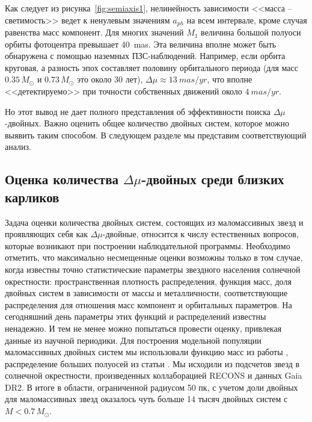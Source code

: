 Как следует из рисунка~\ref{fig:semiaxis1}, нелинейность зависимости <<масса -- светимость>> ведет к ненулевым значениям $a_{ph}$ на всем интервале, кроме случая равенства масс компонент. Для многих значений $M_1$ величина большой полуоси орбиты фотоцентра превышает 40~mas. Эта величина вполне может быть обнаружена с помощью наземных ПЗС-наблюдений. Например, если орбита круговая, а разность эпох составляет половину орбитального периода (для масс  $0.35\,M_\odot$ и $0.73\,M_\odot$ это около 30 лет), $\Delta\mu\approx 13~mas/yr$, что вполне <<детектируемо>> при точности собственных движений около $4~mas/yr$.  

Но этот вывод не дает полного представления об эффективности поиска  $\Delta\mu$-двойных. Важно оценить общее количество двойных систем, которое можно выявить таким способом. В следующем разделе мы представим соответствующий анализ.

\subsection{Оценка количества $\Delta\mu$-двойных среди близких карликов}\label{subsec:ch1/sect2/sub2}
Задача оценки количества двойных систем, состоящих из маломассивных звезд и проявляющих себя как $\Delta\mu$-двойные, относится к числу естественных вопросов, которые возникают при построении наблюдательной программы. Необходимо отметить, что максимально несмещенные оценки возможны только в том случае, когда известны  точно статистические параметры звездного населения солнечной окрестности: пространственная плотность распределения, функция  масс, доля двойных систем в зависимости от массы и металличности, соответствующие распределения для отношения масс компонент и орбитальных параметров. На сегодняшний день параметры этих функций и распределений известны ненадежно. И тем не менее можно попытаться провести оценку, привлекая данные из научной периодики. Для построения модельной популяции маломассивных двойных систем мы использовали функцию масс из работы \cite{2005ASSL..327...41C},
распределение больших полуосей из статьи \cite{2010ApJS..190....1R}. Мы исходили из подсчетов звезд в солнечной окрестности, произведенных коллаборацией RECONS \cite{2019AJ....157..216W} и данных Gaia DR2. В итоге в области, ограниченной радиусом 50 пк, с учетом доли двойных для маломассивных звезд оказалось чуть больше 14 тысяч двойных систем с $M<0.7\,M_\odot$. 

